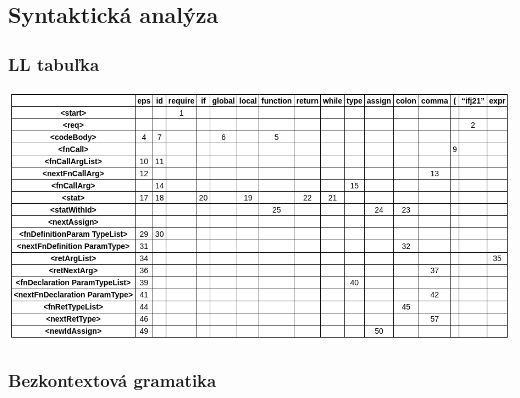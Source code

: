 \documentclass[a4paper, 12pt]{article}
\begin{document}
\subsection{Syntaktická analýza}

\subsubsection{LL tabuľka}

\includegraphics[scale=0.55]{ll_table.png}

\subsubsection{Bezkontextová gramatika}
\end{document}
